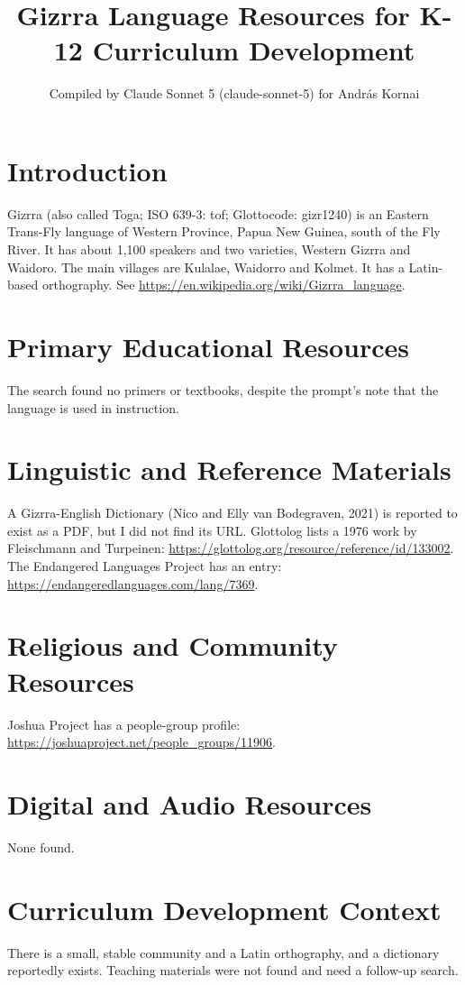 \documentclass[12pt]{article}
\title{Gizrra Language Resources for K-12 Curriculum Development}
\author{Compiled by Claude Sonnet 5 (claude-sonnet-5) for Andr\'as Kornai}
\date{}
\begin{document}
\maketitle

\section{Introduction}
Gizrra (also called Toga; ISO 639-3: tof; Glottocode: gizr1240) is an Eastern Trans-Fly language of Western Province, Papua New Guinea, south of the Fly River. It has about 1,100 speakers and two varieties, Western Gizrra and Waidoro. The main villages are Kulalae, Waidorro and Kolmet. It has a Latin-based orthography. See \url{https://en.wikipedia.org/wiki/Gizrra_language}.

\section{Primary Educational Resources}
The search found no primers or textbooks, despite the prompt's note that the language is used in instruction.

\section{Linguistic and Reference Materials}
A Gizrra-English Dictionary (Nico and Elly van Bodegraven, 2021) is reported to exist as a PDF, but I did not find its URL. Glottolog lists a 1976 work by Fleischmann and Turpeinen: \url{https://glottolog.org/resource/reference/id/133002}. The Endangered Languages Project has an entry: \url{https://endangeredlanguages.com/lang/7369}.

\section{Religious and Community Resources}
Joshua Project has a people-group profile: \url{https://joshuaproject.net/people_groups/11906}.

\section{Digital and Audio Resources}
None found.

\section{Curriculum Development Context}
There is a small, stable community and a Latin orthography, and a dictionary reportedly exists. Teaching materials were not found and need a follow-up search.
\end{document}
